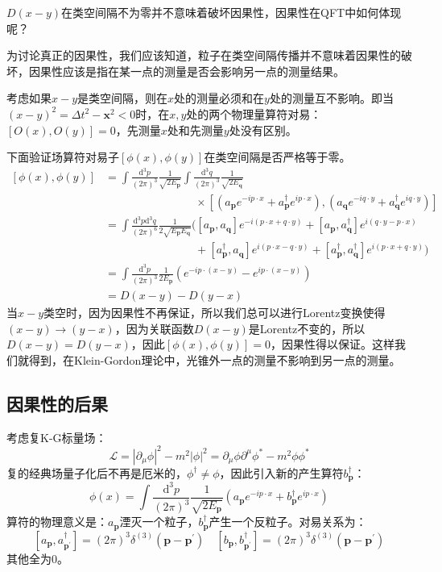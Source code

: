 \documentclass{book}
\begin{document}
$D(x-y)$在类空间隔不为零并不意味着破坏因果性，因果性在QFT中如何体现呢？

为讨论真正的因果性，我们应该知道，粒子在类空间隔传播并不意味着因果性的破坏，因果性应该是指在某一点的测量是否会影响另一点的测量结果。

考虑如果$x-y$是类空间隔，则在$x$处的测量必须和在$y$处的测量互不影响。即当$(x-y)^2=\Delta t^2-\mathbf{x}^2<0$时，在$x,y$处的两个物理量算符对易：$[O(x),O(y)]=0$，先测量$x$处和先测量$y$处没有区别。

下面验证场算符对易子$[\phi(x),\phi(y)]$在类空间隔是否严格等于零。
$$
\begin{aligned}
[\phi(x),\phi(y)]&=\int\frac{\mathrm{d}^{3}p}{(2\pi)^{3}}\frac{1}{\sqrt{2E_{\mathbf{p}}}}\int\frac{\mathrm{d}^{3}q}{(2\pi)^{3}}\frac{1}{\sqrt{2E_{\mathbf{q}}}}  \\
&\quad\quad\quad\quad\quad\quad\quad\quad\times\left[(a_{\mathbf{p}}e^{-ip\cdot x}+a_{\mathbf{p}}^{\dagger}e^{i{p}\cdot x}),(a_{\mathbf{q}}e^{-i{q}\cdot y}+a_{\mathbf{q}}^{\dagger}e^{iq\cdot y})\right] \\
&=\int\frac{\mathrm{d}^3p\mathrm{d}^3 q}{(2\pi)^6}\frac{1}{2\sqrt{E_\mathbf{p}E_\mathbf{q}}}\Big([a_\mathbf{p},a_{\mathbf{q}}]e^{-i(p\cdot x+q\cdot y)}+[a_\mathbf{p},a_\mathbf{q}^\dagger]e^{i(q\cdot y-p\cdot x)}
\\&\quad\quad\quad\quad\quad\quad\quad\quad +[a_\mathbf{p}^\dagger,a_{\mathbf{q}}]e^{i(p\cdot x-q\cdot y)} +[a_\mathbf{p}^\dagger,a_{\mathbf{q}}^\dagger]e^{i(p\cdot x+q\cdot y)}\Big)
\\
&=\int\frac{\mathrm{d}^3p}{(2\pi)^3}\left.\frac1{2E_\mathbf{p}}(e^{-ip\cdot(x-y)}-e^{ip\cdot(x-y)})\right. \\
&=D(x-y)-D(y-x)
\end{aligned}
$$
当$x-y$类空时，因为因果性不再保证，所以我们总可以进行Lorentz变换使得$(x-y)\to(y-x)$，因为关联函数$D(x-y)$是Lorentz不变的，所以$D(x-y)=D(y-x)$，因此$[\phi(x),\phi(y)]=0$，因果性得以保证。这样我们就得到，在Klein-Gordon理论中，光锥外一点的测量不影响到另一点的测量。

\subsection{因果性的后果}
考虑复K-G标量场：
$$
\mathcal{L}=|\partial_\mu \phi|^2-m^2|\phi|^2=\partial_\mu\phi\partial^\mu\phi^\ast-m^2\phi\phi^\ast
$$
复的经典场量子化后不再是厄米的，$\phi^\dagger\ne\phi$，因此引入新的产生算符$b_\mathbf{p}^\dagger$：
$$
\phi(x)=\int\frac{\mathrm{d}^3p}{(2\pi)^3}\frac{1}{\sqrt{2E_\mathbf{p}}}(a_\mathbf{p}e^{-ip\cdot x}+b_\mathbf{p}^\dagger e^{ip\cdot x})
$$
算符的物理意义是：$a_\mathbf{p}$湮灭一个粒子，$b_\mathbf{p}^\dagger$产生一个反粒子。对易关系为：
$$
[a_\mathbf{p},a_{\mathbf{p^\prime}}^\dagger]=(2\pi)^3\delta^{(3)}(\mathbf{p}-\mathbf{p}^\prime) \quad [b_\mathbf{p},b_{\mathbf{p^\prime}}^\dagger]=(2\pi)^3\delta^{(3)}(\mathbf{p}-\mathbf{p}^\prime)
$$
其他全为$0$。
\end{document}
